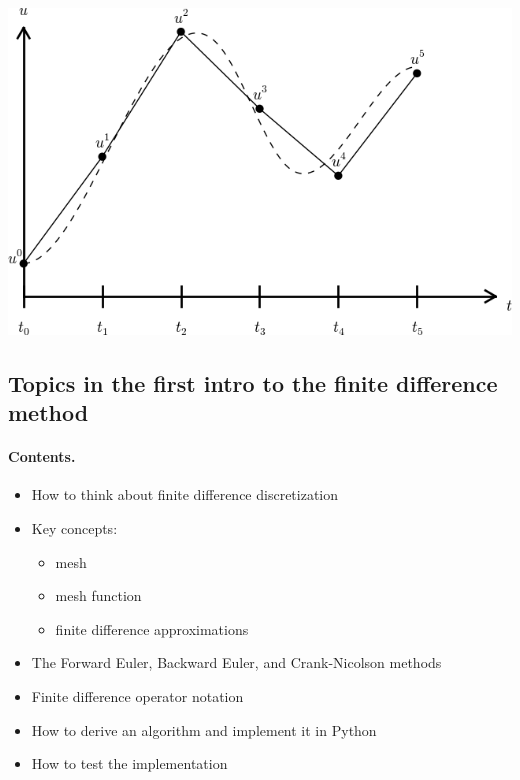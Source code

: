 \documentclass[%
oneside,                 %
final,                   %
10pt]{article}
\begin{document}
\noindent
\centerline{\includegraphics[width=0.7\linewidth]{fig-alg/fdm_u_uei.png}}



\subsection*{Topics in the first intro to the finite difference method}


\paragraph{Contents.}
\begin{itemize}
 \item How to think about finite difference discretization

 \item Key concepts:
\begin{itemize}

   \item mesh

   \item mesh function

   \item finite difference approximations

\end{itemize}

\noindent
 \item The Forward Euler, Backward Euler, and Crank-Nicolson methods

 \item Finite difference operator notation

 \item How to derive an algorithm and implement it in Python

 \item How to test the implementation
\end{itemize}
\end{document}
